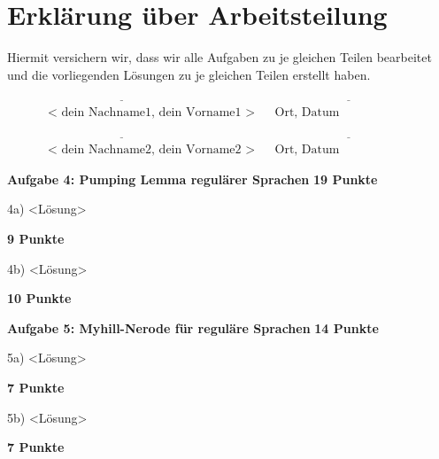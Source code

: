 \documentclass[twoside,10pt,fleqn,headinclude=false]{scrartcl}
\begin{document}
\section*{Erklärung über Arbeitsteilung}

Hiermit versichern wir, dass wir alle Aufgaben zu je gleichen Teilen bearbeitet und die vorliegenden Lösungen zu je gleichen Teilen erstellt haben.

\begin{align*}
	& \underline{\hspace{5cm}} && \underline{\hspace{5cm}}\\
	& \text{< dein Nachname1, dein Vorname1 >} && \text{Ort, Datum}
\end{align*}

\begin{align*}
	& \underline{\hspace{5cm}} && \underline{\hspace{5cm}}\\
	& \text{< dein Nachname2, dein Vorname2 >} && \text{Ort, Datum}
\end{align*}

\newpage

\textbf{Aufgabe 4: Pumping Lemma regulärer Sprachen} \hfill \textbf{19 Punkte}
\begin{compactenum}
	\item[4a)] <Lösung>
	\item[] \hfill \textbf{9 Punkte}
	\item[4b)] <Lösung>
	\item[] \hfill \textbf{10 Punkte}

\end{compactenum}

\newpage

\textbf{Aufgabe 5: Myhill-Nerode für reguläre Sprachen} \hfill \textbf{14 Punkte}
\begin{compactenum}
	\item[5a)] <Lösung>
	\item[] \hfill \textbf{7 Punkte}
	\item[5b)] <Lösung>
	\item[] \hfill \textbf{7 Punkte}

\end{compactenum}

\newpage

\end{document}
